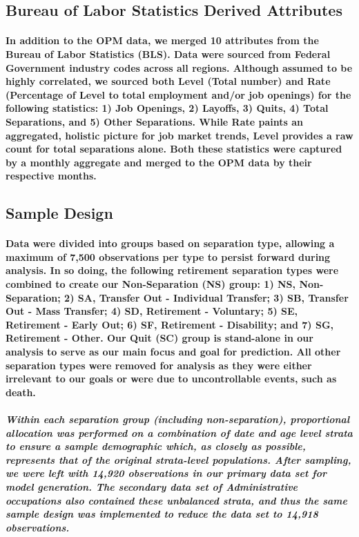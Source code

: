 \documentclass[10pt]{article}
\begin{document}
\subsection{Bureau of Labor Statistics Derived Attributes}

\paragraph{In addition to the OPM data, we merged 10 attributes from the Bureau of Labor Statistics (BLS). Data were sourced from Federal Government industry codes across all regions. Although assumed to be highly correlated, we sourced both Level (Total number) and Rate (Percentage of Level to total employment and/or job openings) for the following statistics: 1) Job Openings, 2) Layoffs, 3) Quits, 4) Total Separations, and 5) Other Separations. While Rate paints an aggregated, holistic picture for job market trends, Level provides a raw count for total separations alone. Both these statistics were captured by a monthly aggregate and merged to the OPM data by their respective months.}
 
\subsection{Sample Design}

\paragraph{Data were divided into groups based on separation type, allowing a maximum of 7,500 observations per type to persist forward during analysis. In so doing, the following retirement separation types were combined to create our Non-Separation (NS) group: 1) NS, Non-Separation; 2) SA, Transfer Out - Individual Transfer; 3) SB, Transfer Out - Mass Transfer; 4) SD, Retirement - Voluntary; 5) SE, Retirement - Early Out; 6) SF, Retirement - Disability; and 7) SG, Retirement - Other. Our Quit (SC) group is stand-alone in our analysis to serve as our main focus and goal for prediction. All other separation types were removed for analysis as they were either irrelevant to our goals or were due to uncontrollable events, such as death.}
 
\subparagraph{Within each separation group (including non-separation), proportional allocation was performed on a combination of date and age level strata to ensure a sample demographic which, as closely as possible, represents that of the original strata-level populations. After sampling, we were left with 14,920 observations in our primary data set for model generation. The secondary data set of Administrative occupations also contained these unbalanced strata, and thus the same sample design was implemented to reduce the data set to 14,918 observations.}
 
\end{document}
